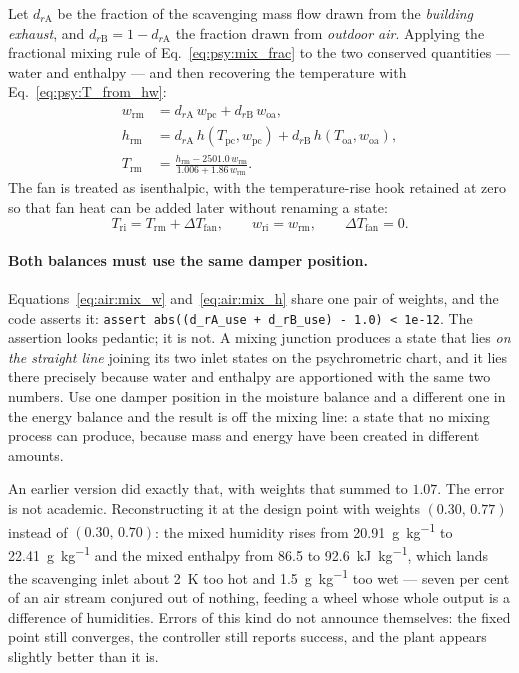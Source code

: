 Let $d_{r\mathrm{A}}$ be the fraction of the scavenging mass flow drawn from
the \emph{building exhaust}, and $d_{r\mathrm{B}}=1-d_{r\mathrm{A}}$ the
fraction drawn from \emph{outdoor air}. Applying the fractional mixing rule
of Eq.~\eqref{eq:psy:mix_frac} to the two conserved quantities --- water and
enthalpy --- and then recovering the temperature with
Eq.~\eqref{eq:psy:T_from_hw}:
\begin{align}
w_{\mathrm{rm}} &= d_{r\mathrm{A}}\,w_{\mathrm{pc}}
                 + d_{r\mathrm{B}}\,w_{\mathrm{oa}},
\label{eq:air:mix_w}\\[2pt]
h_{\mathrm{rm}} &= d_{r\mathrm{A}}\,h(T_{\mathrm{pc}},w_{\mathrm{pc}})
                 + d_{r\mathrm{B}}\,h(T_{\mathrm{oa}},w_{\mathrm{oa}}),
\label{eq:air:mix_h}\\[2pt]
T_{\mathrm{rm}} &= \frac{h_{\mathrm{rm}} - 2501.0\,w_{\mathrm{rm}}}
                        {1.006 + 1.86\,w_{\mathrm{rm}}} .
\label{eq:air:mix_T}
\end{align}
The fan is treated as isenthalpic, with the temperature-rise hook retained at
zero so that fan heat can be added later without renaming a state:
\begin{equation}
T_{\mathrm{ri}} = T_{\mathrm{rm}} + \Delta T_{\mathrm{fan}},
\qquad
w_{\mathrm{ri}} = w_{\mathrm{rm}},
\qquad
\Delta T_{\mathrm{fan}} = 0 .
\label{eq:air:fan}
\end{equation}

\paragraph{Both balances must use the same damper position.}
Equations~\eqref{eq:air:mix_w} and~\eqref{eq:air:mix_h} share one pair of
weights, and the code asserts it:
\verb|assert abs((d_rA_use + d_rB_use) - 1.0) < 1e-12|. The assertion looks
pedantic; it is not. A mixing junction produces a state that lies \emph{on the
straight line} joining its two inlet states on the psychrometric chart, and it
lies there precisely because water and enthalpy are apportioned with the same
two numbers. Use one damper position in the moisture balance and a different
one in the energy balance and the result is off the mixing line: a state that
no mixing process can produce, because mass and energy have been created in
different amounts.

An earlier version did exactly that, with weights that summed to $1.07$. The
error is not academic. Reconstructing it at the design point with weights
$(0.30,\,0.77)$ instead of $(0.30,\,0.70)$: the mixed humidity rises from
\SI{20.91}{\gram\per\kilogram} to \SI{22.41}{\gram\per\kilogram} and the mixed
enthalpy from \num{86.5} to \SI{92.6}{\kilo\joule\per\kilogram}, which lands
the scavenging inlet about \SI{2}{\kelvin} too hot and
\SI{1.5}{\gram\per\kilogram} too wet --- seven per cent of an air stream
conjured out of nothing, feeding a wheel whose whole output is a difference of
humidities. Errors of this kind do not announce themselves: the fixed point
still converges, the controller still reports success, and the plant appears
slightly better than it is.

